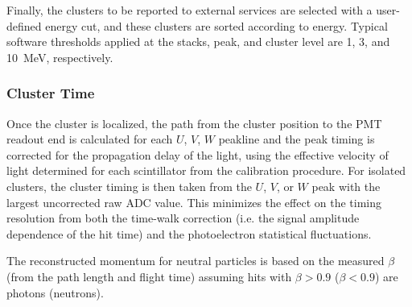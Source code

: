 Finally, the clusters to be reported to external services are selected with a user-defined energy cut, and these
clusters are sorted according to energy. Typical software thresholds applied at the {\color{red} stacks}, peak, and cluster level
are 1, 3, and 10~MeV, respectively.

\subsubsection {Cluster Time}
\label{ec-time}

Once the cluster is localized, the path from the cluster position to the PMT readout end is calculated for each
$U$, $V$, $W$ peakline and the peak timing is corrected for the propagation delay of the light, using the effective
velocity of light determined for each scintillator from the calibration procedure. For isolated clusters, the cluster
timing is then taken from the $U$, $V$, or $W$ peak with the largest uncorrected raw ADC value. This minimizes
the effect on the timing resolution from both the time-walk correction (i.e. the signal amplitude dependence of the
hit time) and the photoelectron statistical fluctuations.

The reconstructed momentum for neutral particles is based on the measured $\beta$ (from the path length and
flight time) assuming hits with $\beta > 0.9$ ($\beta < 0.9$) are photons (neutrons).
